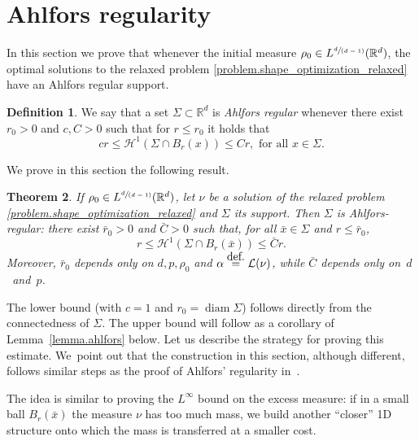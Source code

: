 \documentclass[11pt]{article}
\numberwithin{equation}{section}
\newcommand{\spfrac}[2]{\sfrac{#1}{(#2)}}
\newtheorem{theorem}{Theorem}[section]
\theoremstyle{definition}
\newtheorem{definition}[theorem]{Definition}
\newcommand{\eqdef}{\ensuremath{\stackrel{\mbox{\upshape\tiny def.}}{=}}}
\newcommand\cH{\mathcal{H}}
\newcommand{\RR}{\mathbb{R}}
\DeclareMathOperator{\diam}{diam}
\begin{document}
\section{Ahlfors regularity}\label{section.ahlfors_regularity}
In this section we prove that whenever the initial measure $\rho_0 \in L^{\spfrac{d}{d-1}}(\RR^d)$, the optimal solutions to the relaxed problem \eqref{problem.shape_optimization_relaxed} have an Ahlfors regular support.

\begin{definition}\label{definition.alhfords_regularity}
We say that a set $\Sigma \subset \RR^d$ is \emph{Ahlfors regular} whenever there exist $r_0>0$ and $c,C>0$ such that for $r \le r_0$ it holds that
\[
cr \le \cH^1(\Sigma \cap B_r(x)) \le Cr, \text{ for all $x \in \Sigma$.}
\]
\end{definition}

We prove in this section the following result.
\begin{theorem}\label{th:ahlfors}
If $\rho_0\in L^{\spfrac{d}{d-1}}(\RR^d)$, let $\nu$ be a solution of the relaxed problem \eqref{problem.shape_optimization_relaxed} and $\Sigma$ its support. Then $\Sigma$ is Ahlfors-regular: there exist $\bar r_0>0$ and $\bar C>0$ such that, for all $\bar x \in \Sigma$ and $r \le \bar r_0$,
\[
r \le \cH^1(\Sigma \cap B_r(\bar x)) \le \bar C r.
\]
Moreover, $\bar r_0$ depends only on $d,p,\rho_0$ and $\alpha \eqdef \mathcal{L}(\nu)$, while $\bar C$ depends only on~$d$~and~$p$.
\end{theorem}
The lower bound (with $c=1$ and $r_0=\diam\Sigma$) follows directly from the connectedness of $\Sigma$. The upper bound will follow as a corollary of
Lemma~\ref{lemma.ahlfors} below. Let us describe the strategy for proving this estimate. We~point out that the construction in this section,
although different, follows similar steps as
the proof of Ahlfors' regularity in~\cite[Lem.\,6.1, Th.\,6.4]{paolini2004qualitative}.

The idea is similar to
proving the $L^\infty$ bound on the excess measure: if in a small ball
$B_r(\bar x)$ the measure $\nu$ has too much mass,
we build another ``closer'' 1D structure onto which the mass is transferred at a smaller cost.
\end{document}
